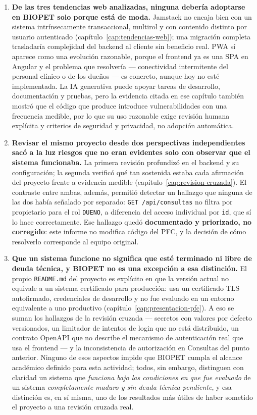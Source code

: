 \begin{enumerate}[nosep]
\item \textbf{De las tres tendencias web analizadas, ninguna deber\'ia
adoptarse en BIOPET solo porque est\'a de moda.} Jamstack no encaja bien con
un sistema intr\'insecamente transaccional, multirol y con contenido
distinto por usuario autenticado (cap\'itulo~\ref{cap:tendencias-web}); una
migraci\'on completa trasladar\'ia complejidad del backend al cliente sin
beneficio real. PWA s\'i aparece como una evoluci\'on razonable, porque el
frontend ya es una SPA en Angular y el problema que resolver\'ia ---
conectividad intermitente del personal cl\'inico o de los due\~nos --- es
concreto, aunque hoy no est\'e implementada. La IA generativa puede apoyar
tareas de desarrollo, documentaci\'on y pruebas, pero la evidencia citada en
ese cap\'itulo tambi\'en mostr\'o que el c\'odigo que produce introduce
vulnerabilidades con una frecuencia medible, por lo que su uso razonable
exige revisi\'on humana expl\'icita y criterios de seguridad y privacidad,
no adopci\'on autom\'atica.

\item \textbf{Revisar el mismo proyecto desde dos perspectivas
independientes sac\'o a la luz riesgos que no eran evidentes solo con
observar que el sistema funcionaba.} La primera revisi\'on profundiz\'o en
el backend y su configuraci\'on; la segunda verific\'o qu\'e tan sostenida
estaba cada afirmaci\'on del proyecto frente a evidencia medible
(cap\'itulo~\ref{cap:revision-cruzada}). El contraste entre ambas, adem\'as,
permiti\'o detectar un hallazgo que ninguna de las dos hab\'ia se\~nalado
por separado: \texttt{GET~/api/consultas} no filtra por propietario para el
rol \texttt{DUENO}, a diferencia del acceso individual por \texttt{id}, que
s\'i lo hace correctamente. Ese hallazgo qued\'o \textbf{documentado y
priorizado, no corregido}: este informe no modifica c\'odigo del PFC, y la
decisi\'on de c\'omo resolverlo corresponde al equipo original.

\item \textbf{Que un sistema funcione no significa que est\'e terminado ni
libre de deuda t\'ecnica, y BIOPET no es una excepci\'on a esa
distinci\'on.} El propio \texttt{README.md} del proyecto es expl\'icito en
que la versi\'on actual no equivale a un sistema certificado para
producci\'on: usa un certificado TLS autofirmado, credenciales de
desarrollo y no fue evaluado en un entorno equivalente a uno productivo
(cap\'itulo~\ref{cap:presentacion-pfc}). A eso se suman los hallazgos de la
revisi\'on cruzada --- secretos con valores por defecto versionados, un
limitador de intentos de login que no est\'a distribuido, un contrato
OpenAPI que no describe el mecanismo de autenticaci\'on real que usa el
frontend --- y la inconsistencia de autorizaci\'on en Consultas del punto
anterior. Ninguno de esos aspectos impide que BIOPET cumpla el alcance
acad\'emico definido para esta actividad; todos, sin embargo, distinguen con
claridad un sistema que \emph{funciona bajo las condiciones en que fue
evaluado} de un sistema \emph{completamente maduro y sin deuda t\'ecnica
pendiente}, y esa distinci\'on es, en s\'i misma, uno de los resultados m\'as
\'utiles de haber sometido el proyecto a una revisi\'on cruzada real.

\end{enumerate}
